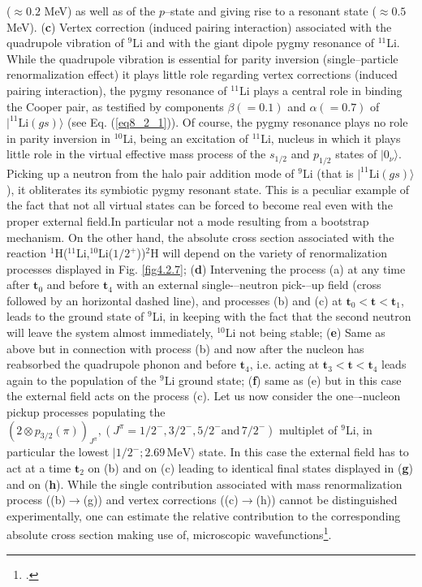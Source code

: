 ($\approx 0.2$ MeV) as well as of the $p$--state and giving rise to a resonant state ($\approx0.5$ MeV). (\textbf{c}) Vertex correction (induced pairing interaction) associated with the quadrupole vibration of $^9$Li and with the giant dipole pygmy resonance of $^{11}$Li. While the quadrupole vibration is essential for parity inversion (single--particle renormalization effect) it plays little role regarding vertex corrections (induced pairing interaction), the pygmy resonance of $^{11}$Li plays a central role in binding the Cooper pair, as testified by components $\beta(=0.1)$ and $\alpha(=0.7)$ of $|^{11}\text{Li}(gs)\rangle$ (see Eq. (\ref{eq8_2_1})). Of course, the pygmy resonance plays no role in parity inversion in $^{10}$Li, being an excitation of $^{11}$Li, nucleus in which it plays little role in the virtual effective mass process of the $s_{1/2}$ and $p_{1/2}$ states of $|0_\nu\rangle$. Picking up a neutron from the halo pair addition mode of $^9$Li (that is $|^{11}\text{Li}(gs)\rangle$), it obliterates its symbiotic pygmy resonant state. This is  a peculiar example of the fact that not all virtual states can be forced to become real even with the proper external field.In particular not a mode resulting from a bootstrap mechanism. On the other hand, the absolute cross section associated with the reaction  $^1$H($^{11}$Li,$^{10}$Li($1/2^+$))$^2$H will depend on the variety of renormalization processes displayed in Fig. \ref{fig4.2.7}; (\textbf{d}) Intervening the process (a) at any time after
$\mathbf{t}_0$ and before $\mathbf{t}_4$ with an external single-–neutron pick-–up field (cross followed by an horizontal dashed line), and processes (b) and (c) at $\mathbf{t}_0<\mathbf{t}<\mathbf{t}_1$, 
 leads to the ground state of $^9$Li, in keeping with the fact that the second neutron will leave the system
almost immediately, $^{10}$Li not being stable; (\textbf{e}) Same as above but in connection with process (b) and now after the nucleon has reabsorbed
the quadrupole phonon and before $\mathbf{t}_4$, i.e. acting at $\mathbf{t}_3<\mathbf{t}<\mathbf{t}_4$ leads again to the population of the $^9$Li ground state; (\textbf{f}) same as (e) but in this case the external field acts on the process (c). Let us now consider
the one–-nucleon pickup processes populating the $(2\otimes p_{3/2}(\pi))_{J^{\pi}}, (J^{\pi}=1/2^-,3/2^-,5/2^-\text{and}\, 7/2^-)$ multiplet of $^9$Li, in particular the lowest
$|1/2^-;2.69\, \text{MeV}\rangle$ state. In this case the external field has to act at a time $\mathbf{t}_2$ on (b) and on (c) leading to  identical final states displayed in (\textbf{g}) and on (\textbf{h}). While
the single contribution associated with mass renormalization process ((b)$\rightarrow$(g)) and vertex corrections ((c)$\rightarrow$(h)) cannot be 
distinguished experimentally, one can estimate the relative contribution to the corresponding absolute cross section making use of, microscopic wavefunctions\footnote{\cite{Barranco:01}.}.


